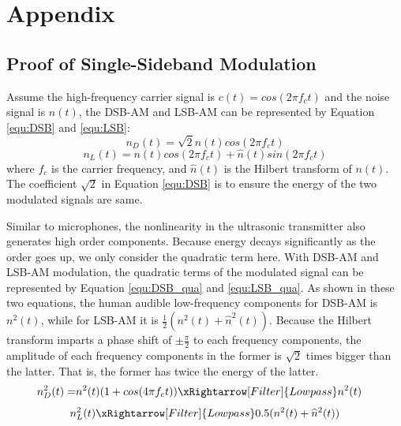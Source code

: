 \section*{Appendix}

\subsection{Proof of Single-Sideband Modulation}
\label{subsec:proof_of_ssb}
Assume the high-frequency carrier signal is $c(t) = cos(2\pi f_c t)$ and the noise signal is $n(t)$, the DSB-AM and LSB-AM can be represented by Equation \ref{equ:DSB} and \ref{equ:LSB}:
\begin{equation}
   n_D(t) = \sqrt{2}n(t) cos(2\pi f_c t)
    \label{equ:DSB}
\end{equation}
\begin{equation}
    n_L(t) = n(t) cos(2\pi f_c t) + \widehat{n}(t) sin(2\pi f_c t)
    \label{equ:LSB}
 \end{equation}
where $f_c$ is the carrier frequency, and $\hat{n}(t)$ is the Hilbert transform of $n(t)$. The coefficient $\sqrt{2}$ in Equation \ref{equ:DSB} is to ensure the energy of the two modulated signals are same.
 
Similar to microphones, the nonlinearity in the ultrasonic transmitter also generates high order components. Because energy decays significantly as the order goes up, we only consider the quadratic term here. With DSB-AM and LSB-AM modulation, the quadratic terms of the modulated signal can be represented by Equation \ref{equ:DSB_qua} and \ref{equ:LSB_qua}. As shown in these two equations, the human audible low-frequency components for DSB-AM is $n^2(t)$, while for LSB-AM it is $\frac{1}{2}(n^2(t) + \widehat{n}^2(t))$. Because the Hilbert transform imparts a phase shift of $\pm \frac{\pi}{2}$ to each frequency components, the amplitude of each frequency components in the former is $\sqrt{2}$ times bigger than the latter. That is, the former has twice the energy of the latter. 
\begin{equation}
    \begin{aligned}
     n^2_{D}(t) = &n^2(t)(1+cos(4\pi f_c t))\xRightarrow[Filter]{Lowpass} n^2(t)
    \end{aligned}
    \label{equ:DSB_qua}
\end{equation}
\begin{equation}
    \begin{aligned}
        n^2_{L}(t) \xRightarrow[Filter]{Lowpass}0.5(n^2(t) + \widehat{n}^2(t))
    \end{aligned}
    \label{equ:LSB_qua}
\end{equation}
